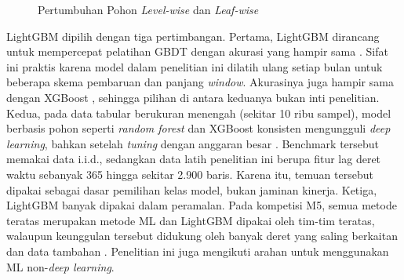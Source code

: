 \begin{figure}[htbp]
  \centering
  \caption{Pertumbuhan Pohon \textit{Level-wise} dan \textit{Leaf-wise}}
  \label{fig:pohon-lgbm}
\end{figure}

LightGBM dipilih dengan tiga pertimbangan. Pertama, LightGBM dirancang untuk
mempercepat pelatihan GBDT dengan akurasi yang hampir sama \cite{ke2017}.
Sifat ini praktis karena model dalam penelitian ini dilatih ulang setiap bulan
untuk beberapa skema pembaruan dan panjang \textit{window}. Akurasinya juga
hampir sama dengan XGBoost \cite{ke2017,chen2016}, sehingga pilihan di antara
keduanya bukan inti penelitian. Kedua, pada data tabular berukuran menengah
(sekitar 10 ribu sampel), model berbasis pohon seperti \textit{random forest}
dan XGBoost konsisten mengungguli \textit{deep learning}, bahkan setelah
\textit{tuning} dengan anggaran besar \cite{grinsztajn2022}. Benchmark
tersebut memakai data i.i.d., sedangkan data latih penelitian ini berupa fitur
lag deret waktu sebanyak 365 hingga sekitar 2.900 baris. Karena itu, temuan
tersebut dipakai sebagai dasar pemilihan kelas model, bukan jaminan kinerja.
Ketiga, LightGBM banyak dipakai dalam peramalan. Pada kompetisi M5, semua
metode teratas merupakan metode ML dan LightGBM dipakai oleh tim-tim teratas,
walaupun keunggulan tersebut didukung oleh banyak deret yang saling berkaitan
dan data tambahan \cite{makridakis2022}. Penelitian ini juga mengikuti arahan
untuk menggunakan ML non-\textit{deep learning}.

